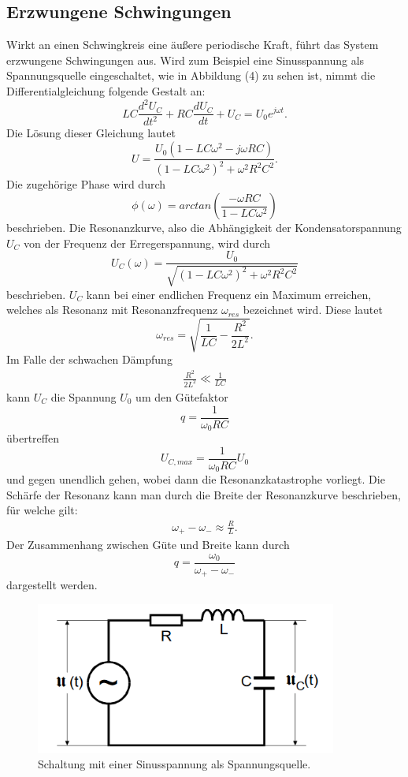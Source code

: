 \subsection{Erzwungene Schwingungen}
Wirkt an einen Schwingkreis eine äußere periodische Kraft, führt das System erzwungene Schwingungen aus.
Wird zum Beispiel eine Sinusspannung als Spannungsquelle eingeschaltet, wie in Abbildung (4) zu sehen ist,
nimmt die Differentialgleichung folgende Gestalt an:
\begin{equation}
LC\frac{d^2 U_C}{dt^2} + RC\frac{d U_C}{dt} + U_C = U_0 e^{j\omega t} .
\end{equation}
Die Lösung dieser Gleichung lautet
\begin{equation}
U = \frac{U_0(1-LC\omega^2 - j\omega RC)}{(1-LC\omega^2)^2 + \omega^2 R^2 C^2} .
\end{equation}
Die zugehörige Phase wird durch 
\begin{equation}
\phi(\omega) = arctan(\frac{-\omega RC}{1-LC\omega^2})
\end{equation}
beschrieben.
Die Resonanzkurve, also die Abhängigkeit der Kondensatorspannung $U_C$ von der Frequenz der Erregerspannung, wird durch
\begin{equation}
U_C(\omega) = \frac{U_0}{\sqrt{(1-LC\omega^2)^2 + \omega^2 R^2 C^2}}
\end{equation}
beschrieben. $U_C$ kann bei einer endlichen Frequenz ein Maximum erreichen, welches als Resonanz mit Resonanzfrequenz $\omega_{res}$ bezeichnet wird.
Diese lautet
\begin{equation}
\omega_{res} = \sqrt{\frac{1}{LC} - \frac{R^2}{2L^2}} .
\end{equation}
Im Falle der schwachen Dämpfung
\begin{align*}
\frac{R^2}{2L^2} \ll \frac{1}{LC}
\end{align*}
kann $U_C$ die Spannung $U_0$ um den Gütefaktor
\begin{equation}
q = \frac{1}{\omega_0 RC}
\end{equation}
\noindent übertreffen 
\begin{equation}
U_{C,max} = \frac{1}{\omega_0 RC}U_0
\end{equation}
und gegen unendlich gehen, wobei dann die Resonanzkatastrophe vorliegt.
Die Schärfe der Resonanz kann man durch die Breite der Resonanzkurve beschrieben, für welche gilt:
\begin{align}
\omega _+ - \omega _- \approx \frac{R}{L} .
\end{align}
\noindent Der Zusammenhang zwischen Güte und Breite kann durch
\begin{equation}
q = \frac{\omega_0}{\omega_+ - \omega_-}
\end{equation}
dargestellt werden.
\begin{figure}[H]
  \centering
  \includegraphics[height=5cm]{erzwungen.png}
  \caption{Schaltung mit einer Sinusspannung als Spannungsquelle. \cite[S.6]{kent}}
\end{figure}
